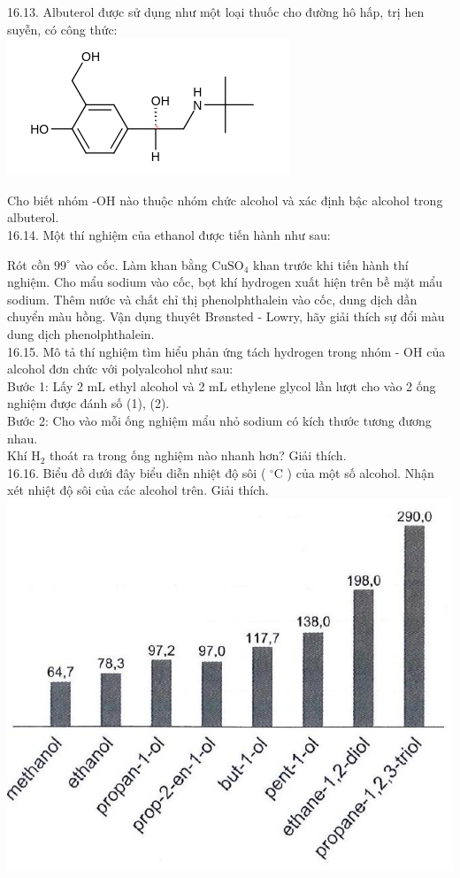 \documentclass[10pt]{article}
\begin{document}
16.13. Albuterol được sử dụng như một loại thuốc cho đường hô hấp, trị hen suyễn, có công thức:\\
\includegraphics{smile-c7881721e14a2bc3464e6044bfe434d1e8a58dfa}

Cho biết nhóm -OH nào thuộc nhóm chức alcohol và xác định bậc alcohol trong albuterol.\\
16.14. Một thí nghiệm của ethanol được tiến hành như sau:

Rót cồn $99^{\circ}$ vào cốc. Làm khan bằng $\mathrm{CuSO}_{4}$ khan trước khi tiến hành thí nghiệm. Cho mẩu sodium vào cốc, bọt khí hydrogen xuất hiện trên bề mặt mẩu sodium. Thêm nước và chất chỉ thị phenolphthalein vào cốc, dung dịch dần chuyển màu hồng. Vận dụng thuyêt Brønsted - Lowry, hãy giải thích sự đổi màu dung dịch phenolphthalein.\\
16.15. Mô tả thí nghiệm tìm hiểu phản ứng tách hydrogen trong nhóm - OH của alcohol đơn chức với polyalcohol như sau:\\
Bước 1: Lấy 2 mL ethyl alcohol và 2 mL ethylene glycol lần lượt cho vào 2 ống nghiệm được đánh số (1), (2).\\
Bước 2: Cho vào mỗi ống nghiệm mẩu nhỏ sodium có kích thước tương đương nhau.\\
Khí $\mathrm{H}_{2}$ thoát ra trong ống nghiệm nào nhanh hơn? Giải thích.\\
16.16. Biểu đồ dưới đây biểu diễn nhiệt độ sôi ( ${ }^{\circ} \mathrm{C}$ ) của một số alcohol. Nhận xét nhiệt độ sôi của các alcohol trên. Giải thích.\\
\includegraphics[max width=\textwidth, center]{2025_10_23_ae7aef68fb3b41082d29g-37(2)}
\end{document}
